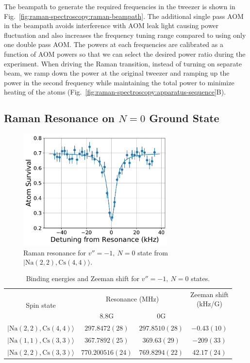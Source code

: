 The beampath to generate the required frequencies in the tweezer is shown in
Fig.~\ref{fig:raman-spectroscopy:raman-beampath}.
The additional single pass AOM in the beampath avoids interference
with AOM leak light causing power fluctuation and
also increases the frequency tuning range compared to using only one double pass AOM.
The powers at each frequencies are calibrated as a function of AOM powers
so that we can select the desired power ratio during the experiment.
When driving the Raman transition, instead of turning on separate beam,
we ramp down the power at the original tweezer and ramping up the power
in the second frequency while maintaining the total power to minimize heating of the atoms
(Fig.~\ref{fig:raman-spectroscopy:apparatus-sequence}B).

\subsection{Raman Resonance on $N=0$ Ground State}

\begin{figure}
  \centering
  \includegraphics[width=0.7\textwidth]{figures/raman_spectroscopy_resonance.pdf}
  \caption[Raman resonance for $v''=-1,\ N=0$ state]{
    Raman resonance for $v''=-1,\ N=0$ state from $|\mathrm{Na(2, 2),Cs(4, 4)}\rangle$.
    \label{fig:raman-spectroscopy:resonance}}
\end{figure}

\begin{table}
  \centering
  \begin{tabular}{|c|c|c|c|}
    \hline
    \multirow{2}{*}{Spin state}&\multicolumn{2}{c|}{Resonance (MHz)}&\multirowcell{2}{Zeeman shift\\(kHz/G)}\\\cline{2-3}
    {}&$8.8 \mathrm{G}$&$0 \mathrm{G}$&\\\hline
    $|\mathrm{Na(2, 2),Cs(4, 4)}\rangle$&$297.8472(28)$&$297.8510(28)$&$-0.43(10)$\\\hline
    $|\mathrm{Na(1, 1),Cs(3, 3)}\rangle$&$367.7892(25)$&$369.63(29)$&$-209(33)$\\\hline
    $|\mathrm{Na(2, 2),Cs(3, 3)}\rangle$&$770.200516(24)$&$769.8294(22)$&$42.17(24)$\\\hline
  \end{tabular}
  \caption[Binding energies for $v''=-1,\ N=0$ states]{
    Binding energies and Zeeman shift for $v''=-1,\ N=0$ states.
    \label{table:raman-spectroscopy:n0}}
\end{table}


